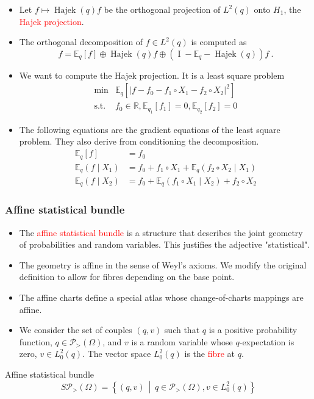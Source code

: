 \documentclass[xcolor=svgnames]{beamer}
\DeclareMathOperator{\Hajek}{Hajek}
\newcommand{\avalof}[1]{\left\vert#1\right\vert}
\newcommand{\condexpat}[3]{\mathbb E_{#1}\left(#2 \middle| #3\right)}
\newcommand{\expectat}[2]{\mathbb E_{#1}\left[#2\right]}
\newcommand{\hajekof}[1]{\Hajek\left(#1\right)}
\newcommand{\opensimplexon}[1]{\mathcal P_>\left(#1\right)}
\newcommand{\reals}{\mathbb{R}}
\newcommand{\rosso}[1]{\textcolor{red}{#1}}
\newcommand{\setof}[2]{\left\{#1 \, \middle| \, #2 \right\}}
\renewcommand{\emph}{\rosso}
\begin{document}
\begin{frame}
\begin{itemize}
    \item Let $f \mapsto \hajekof q f$ be the orthogonal projection of $L^2(q)$ onto $H_1$, the \emph{Hajek projection}.
    \item The orthogonal decomposition of $f \in L^2(q)$ is computed as
    \begin{equation*}
        f = \expectat q f \oplus \hajekof q f \oplus (\operatorname I  - 
 \mathbb E_q - \hajekof q) f \ .
    \end{equation*}
    \item We want to compute the Hajek projection. It is a least square problem
    \begin{align*}
    \min& \expectat q {\avalof {f - f_0 - f_1\circ X_1 - f_2\circ X_2}^2} \\    
    \text{s.t.}& f_0 \in \reals, \expectat {q_1} {f_1} = 0, \expectat {q_2} {f_2} = 0
    \end{align*}
    \item The following equations are the gradient equations of the least square problem. They also derive from conditioning the decomposition.
    \begin{align*}
        \expectat q {f} &= f_0 \\
        \condexpat q {f}{X_1} &= f_0 + f_1\circ X_1 + \condexpat q {f_2 \circ X_2}{X_1} \\ 
            \condexpat q {f}{X_2} &= f_0 + \condexpat q {f_1 \circ X_1}{X_2} + f_2\circ X_2
        \end{align*}
\end{itemize}
\end{frame}

\begin{frame}\small\frametitle{Affine statistical bundle}
\begin{itemize}
    \item The \emph{affine statistical bundle} is a structure that describes the joint geometry of probabilities and random variables. This justifies the adjective "statistical".
    \item The geometry is affine in the sense of Weyl's axioms. We modify the original definition to allow for fibres depending on the base point.
\item The affine charts define a special atlas whose change-of-charts mappings are affine.
\item We consider the set of couples $(q,v)$ such that $q$ is a positive probability function, $q \in \opensimplexon \Omega$, and $v$ is a random variable whose $q$-expectation is zero, $v \in L^2_0(q)$. The vector space $L_0^2(q)$ is the \emph{fibre} at $q$.
\end{itemize} 

\begin{block}{Affine statistical bundle}
    \begin{equation*}
        S\opensimplexon \Omega = \setof{(q,v)}{q \in \opensimplexon \Omega, v \in L^2_0(q)}
    \end{equation*}
\end{block}
\end{frame}
\end{document}
